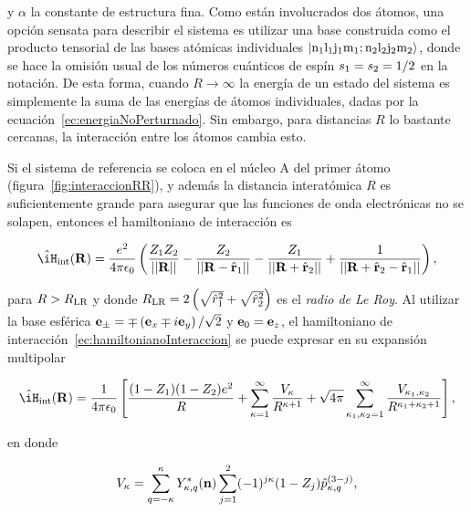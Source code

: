 y $\alpha$ la constante de estructura fina. Como están involucrados dos átomos, una opción sensata para describir el sistema es utilizar una base construida como el producto tensorial de las bases atómicas individuales $\ket{n_\sm{1}l_\sm{1}j_\sm{1}m_\sm{1};n_\sm{2}l_\sm{2}j_\sm{2}m_\sm{2}}$, donde se hace la omisión usual de los números cuánticos de espín $s_{1}=s_{2}=1/2$ en la notación. De esta forma, cuando $R\to\infty$ la energía de un estado del sistema es simplemente la suma de las energías de átomos individuales, dadas por la ecuación~\ref{ec:energiaNoPerturnado}. Sin embargo, para distancias $R$ lo bastante cercanas, la interacción entre los átomos cambia esto.

\p Si el sistema de referencia se coloca en el núcleo A del primer átomo (figura~\ref{fig:interaccionRR}), y además la distancia interatómica $R$ es suficientemente grande para asegurar que las funciones de onda electrónicas no se solapen, entonces el hamiltoniano de interacción es

\begin{equation}
\label{ec:hamiltonianoInteraccionRydberg}
\hat{\iH}_\sm{\text{int}}(\vektor{R})=\frac{e^{2}}{4\pi\epsilon_\sm{0}}\left(\frac{Z_\sm{1}Z_\sm{2}}{\norm{\vektor{R}}}-\frac{Z_\sm{2}}{\norm{\vektor{R}-\hat{\vektor{r}}_\sm{1}}}-\frac{Z_\sm{1}}{\norm{\vektor{R}+\hat{\vektor{r}}_\sm{2}}}+\frac{1}{\norm{\vektor{R}+\hat{\vektor{r}}_\sm{2}-\hat{\vektor{r}}_\sm{1}}}\right),
\end{equation}

para $R>R_{\text{LR}}$ y donde $R_\sm{\text{LR}}=2\left(\sqrt{\braket{\hat{r}^{2}}_\sm{1}}+\sqrt{\braket{\hat{r}^{2}}_\sm{2}}\right)$ es el \emph{radio de Le Roy}. Al utilizar la base esférica $\text{\textbf{e}}_{\pm}=\mp\left(\text{\textbf{e}}_{x}\mp i\text{\textbf{e}}_{y}\right)/\sqrt{2}$ y $\text{\textbf{e}}_{0}=\text{\textbf{e}}_{z}$, el hamiltoniano de interacción~\ref{ec:hamiltonianoInteraccion} se puede expresar en su expansión multipolar

\begin{equation}
\label{ec:expansionMultipolar}
\hat{\iH}_\sm{\text{int}}(\vektor{R})=\frac{1}{4\pi\epsilon_\sm{0}}\left[\frac{(1-Z_\sm{1})(1-Z_\sm{2})e^{2}}{R}+\sum_{\kappa=1}^{\infty}\frac{V_\sm{\kappa}}{R^{\kappa+1}}+\sqrt{4\pi}\sum_{\kappa_{1},\kappa_{2}=1}^{\infty}\frac{V_\sm{\kappa_{1},\kappa_{2}}}{R^{\kappa_{1}+\kappa_{2}+1}}\right],
\end{equation}

en donde

\begin{equation}
\label{ec:vectorPotencial}
V_{\kappa}=\sum_{q=-\kappa}^{\kappa}Y_{\kappa,q}^{*}(\text{\textbf{n}})\sum_{j=1}^{2}(-1)^{j\kappa}(1-Z_{j})\hat{p}_{\kappa,q}^{(3-j)},
\end{equation}

